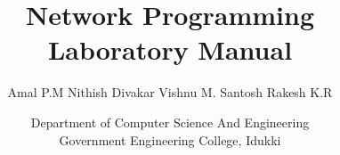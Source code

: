 \documentclass[twosided,openright]{book}
\title{Network Programming\\Laboratory Manual}
\author{
    \parbox{0.5\textwidth}{
    	{Amal P.M}
    	\hfill
    	{Nithish Divakar}
    	\newline
    	{Vishnu M. Santosh}
    	\hfill
    	{Rakesh K.R}
    }
}
\date{%
	\vfill
	\small%
	{Department of Computer Science And Engineering}\\
	{Government Engineering College, Idukki}
}
\begin{document}
	\maketitle
	\cleanfooter
	\tableofcontents
	\putfooter
	
	
	
	
\end{document}
